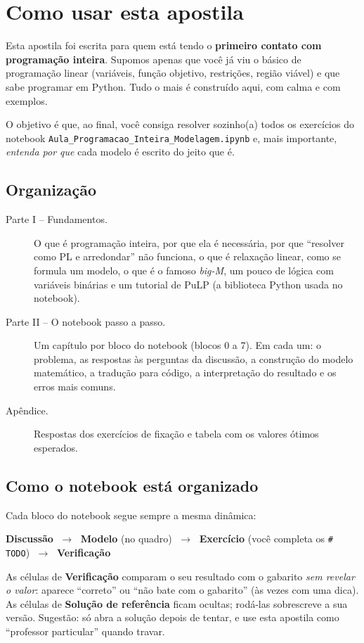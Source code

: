 \chapter*{Como usar esta apostila}

Esta apostila foi escrita para quem está tendo o \textbf{primeiro contato com programação inteira}. Supomos
apenas que você já viu o básico de programação linear (variáveis, função objetivo, restrições, região viável) e que
sabe programar em Python. Tudo o mais é construído aqui, com calma e com exemplos.

O objetivo é que, ao final, você consiga resolver sozinho(a) todos os exercícios do notebook
\texttt{Aula\_Programacao\_Inteira\_Modelagem.ipynb} e, mais importante, \emph{entenda por que} cada modelo é
escrito do jeito que é.

\section*{Organização}

\begin{description}
  \item[Parte I -- Fundamentos.] O que é programação inteira, por que ela é necessária, por que ``resolver como PL e
  arredondar'' não funciona, o que é relaxação linear, como se formula um modelo, o que é o famoso \emph{big-M}, um
  pouco de lógica com variáveis binárias e um tutorial de PuLP (a biblioteca Python usada no notebook).
  \item[Parte II -- O notebook passo a passo.] Um capítulo por bloco do notebook (blocos 0 a 7). Em cada um:
  o problema, as respostas às perguntas da discussão, a construção do modelo matemático, a tradução para código, a
  interpretação do resultado e os erros mais comuns.
  \item[Apêndice.] Respostas dos exercícios de fixação e tabela com os valores ótimos esperados.
\end{description}

\section*{Como o notebook está organizado}

Cada bloco do notebook segue sempre a mesma dinâmica:
\begin{center}
\textbf{Discussão} $\;\rightarrow\;$ \textbf{Modelo} (no quadro) $\;\rightarrow\;$ \textbf{Exercício} (você completa os
\texttt{\# TODO}) $\;\rightarrow\;$ \textbf{Verificação}
\end{center}
As células de \textbf{Verificação} comparam o seu resultado com o gabarito \emph{sem revelar o valor}: aparece
``correto'' ou ``não bate com o gabarito'' (às vezes com uma dica). As células de \textbf{Solução de referência} ficam
ocultas; rodá-las sobrescreve a sua versão. Sugestão: só abra a solução depois de tentar, e use esta apostila
como ``professor particular'' quando travar.

